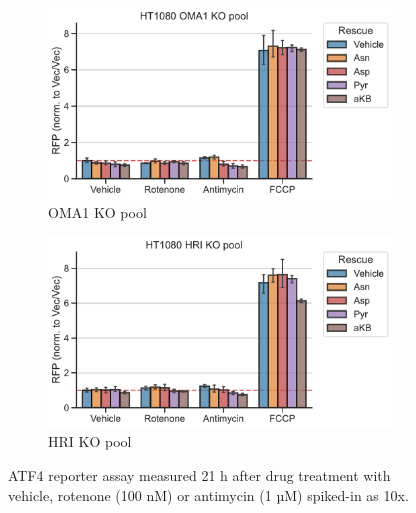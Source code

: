 \begin{figure}[!ht]
     \centering
     \begin{subfigure}[b]{0.49\textwidth}
         \includegraphics[width=\textwidth]{figures/sapp/ISR/ATF4rep_OMA1pool.pdf}
         \caption{OMA1 KO pool}
         \label{fig:sapp:ISR:ATF4rep_OMA1pool}
     \end{subfigure}
     \hfill
     \begin{subfigure}[b]{0.49\textwidth}
         \includegraphics[width=\textwidth]{figures/sapp/ISR/ATF4rep_HRIpool.pdf}
         \caption{HRI KO pool}
         \label{fig:sapp:ISR:ATF4rep_HRIpool}
     \end{subfigure}
     \hfill
        \caption[ATF4 post mito inhib. OMA1/HRI KO, reporter.]{
        ATF4 reporter assay measured 21 h after drug treatment with vehicle, rotenone (100 nM) or antimycin (1 µM) spiked-in as 10x.
        }
        \label{fig:sapp:ISR:ATF4rep_OMA1_HRIpool}
\end{figure}

